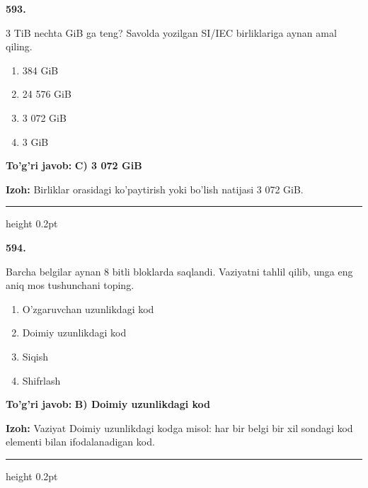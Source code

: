 \documentclass[10pt,a4paper,oneside]{article}
\begin{document}
\noindent\textbf{\color{ink}593.}
\par
3 TiB nechta GiB ga teng? Savolda yozilgan SI/IEC birliklariga aynan amal qiling.
\begin{enumerate}[label=\Alph*),leftmargin=9mm]
\item 384 GiB
\item 24 576 GiB
\item 3 072 GiB
\item 3 GiB
\end{enumerate}
\begin{tcolorbox}[enhanced,breakable,colback=teal!4,colframe=teal!50!black,boxrule=0.5pt,arc=1.1mm,left=3mm,right=3mm,top=1.7mm,bottom=1.7mm,before skip=2mm,after skip=2mm]
\textbf{\color{teal}To'g'ri javob:} \textbf{C) 3 072 GiB}
\par\smallskip
\textbf{Izoh:} Birliklar orasidagi ko'paytirish yoki bo'lish natijasi 3 072 GiB.
\end{tcolorbox}
\vspace{2mm}\hrule height 0.2pt \vspace{3mm}

\noindent\textbf{\color{ink}594.}
\par
Barcha belgilar aynan 8 bitli bloklarda saqlandi. Vaziyatni tahlil qilib, unga eng aniq mos tushunchani toping.
\begin{enumerate}[label=\Alph*),leftmargin=9mm]
\item O'zgaruvchan uzunlikdagi kod
\item Doimiy uzunlikdagi kod
\item Siqish
\item Shifrlash
\end{enumerate}
\begin{tcolorbox}[enhanced,breakable,colback=teal!4,colframe=teal!50!black,boxrule=0.5pt,arc=1.1mm,left=3mm,right=3mm,top=1.7mm,bottom=1.7mm,before skip=2mm,after skip=2mm]
\textbf{\color{teal}To'g'ri javob:} \textbf{B) Doimiy uzunlikdagi kod}
\par\smallskip
\textbf{Izoh:} Vaziyat Doimiy uzunlikdagi kodga misol: har bir belgi bir xil sondagi kod elementi bilan ifodalanadigan kod.
\end{tcolorbox}
\vspace{2mm}\hrule height 0.2pt \vspace{3mm}
\end{document}
